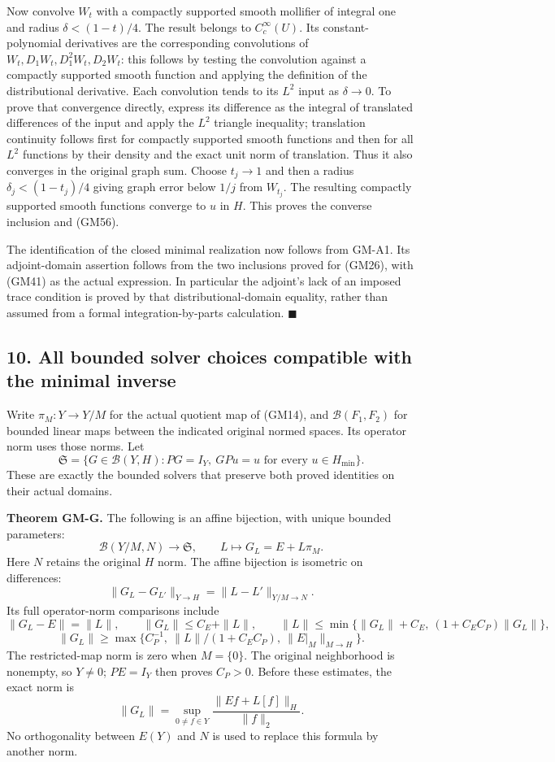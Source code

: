 \documentclass[
  11pt,
]{article}
\begin{document}
Now convolve \(W_t\) with a compactly supported
smooth mollifier of integral one and radius \(\delta<(1-t)/4\).
The result belongs to \(C_c^\infty(U)\). Its
constant-polynomial derivatives are the corresponding convolutions of
\(W_t,D_1W_t,D_1^2W_t,D_2W_t\): this follows by testing the convolution
against a compactly supported smooth function and applying the
definition of the distributional derivative. Each convolution tends to
its \(L^2\) input as \(\delta\to0\). To
prove that convergence directly, express its difference as the integral
of translated differences of the input and apply the
\(L^2\) triangle inequality; translation continuity
follows first for compactly supported smooth functions and then for all
\(L^2\) functions by their density and the exact unit
norm of translation. Thus it also converges in the original graph sum.
Choose \(t_j\to1\) and then a radius
\(\delta_j<(1-t_j)/4\) giving graph error below
\(1/j\) from \(W_{t_j}\). The
resulting compactly supported smooth functions converge to
\(u\) in \(H\). This proves
the converse inclusion and (GM56).

The identification of the closed minimal realization now follows from
GM-A1. Its adjoint-domain assertion follows from the two inclusions
proved for (GM26), with (GM41) as the actual expression. In particular
the adjoint's lack of an imposed trace condition is proved by that
distributional-domain equality, rather than assumed from a formal
integration-by-parts calculation. \hfill\ensuremath{\blacksquare}

\subsection{10. All bounded solver choices compatible with the minimal
inverse}\label{all-bounded-solver-choices-compatible-with-the-minimal-inverse}

Write \(\pi_M:Y\to Y/M\) for the actual quotient map of (GM14),
and \(\mathcal B(F_1,F_2)\) for bounded linear maps between the
indicated original normed spaces. Its operator norm uses those norms.
Let \[
 \mathfrak S
   =\{G\in\mathcal B(Y,H):
         PG=I_Y,\ GPu=u\text{ for every }u\in H_{\min}\}.
\] These are exactly the bounded solvers
that preserve both proved identities on their actual domains.

\textbf{Theorem GM-G.} The following is an affine bijection, with unique
bounded parameters: \[
 \mathcal B(Y/M,N)\longrightarrow\mathfrak S,
 \qquad
 L\longmapsto G_L=E+L\pi_M .
 \tag{GM58}
\] Here
\(N\) retains the original
\(H\) norm. The affine bijection is isometric on
differences: \[
 \|G_L-G_{L'}\|_{Y\to H}
       =\|L-L'\|_{Y/M\to N}.
\] Its full operator-norm
comparisons include \[
 \|G_L-E\|=\|L\|,\qquad
 \|G_L\|\leq C_E+\|L\|,\qquad
 \|L\|\leq\min\{\|G_L\|+C_E,\ (1+C_EC_P)\|G_L\|\},
\]
\[
 \|G_L\|\geq
   \max\{C_P^{-1},\ \|L\|/(1+C_EC_P),\
                       \|E|_M\|_{M\to H}\}.
 \tag{GM59}
\] The restricted-map norm is zero when
\(M=\{0\}\). The original neighborhood is nonempty, so
\(Y\neq0\); \(PE=I_Y\) then proves
\(C_P>0\). Before these estimates, the exact norm is
\[
 \|G_L\|=\sup_{0\neq f\in Y}
            \frac{\|Ef+L[f]\|_H}{\|f\|_2}.
\] No orthogonality between
\(E(Y)\) and \(N\) is used to
replace this formula by another norm.
\end{document}
